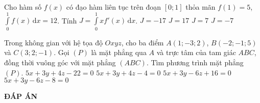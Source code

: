 \begin{ex}[2D3G2-4]
Cho hàm số $f(x)$ có đạo hàm liên tục trên đoạn $[0;1]$ thỏa mãn $f(1) = 5$, $\displaystyle\int\limits_0^1 f(x) \mathrm{\,d}x = 12$. Tính $J = \displaystyle\int\limits_0^1 x f'(x) \mathrm{\,d}x$.
\choice
{$J = -17$}
{$J = 17$}
{$J = 7$}
{\True $J = -7$}
\end{ex}

\begin{ex}%
Trong không gian với hệ tọa độ $Oxyz$, cho ba điểm $A(1;-3;2)$, $B(-2;-1;5)$ và $C(3;2;-1)$. Gọi $(P)$ là mặt phẳng qua $A$ và trực tâm của tam giác $ABC$, đồng thời vuông góc với mặt phẳng $(ABC)$. Tìm phương trình mặt phẳng $(P)$.
\choice
{$5x + 3y + 4z -22 = 0$}
{$5x + 3y + 4z - 4 = 0$}
{\True $5x + 3y - 6z + 16 = 0$}
{$5x + 3y - 6z - 8 = 0$}
\end{ex}

\newpage
\begin{center}
	\textbf{ĐÁP ÁN}
\end{center}
\begin{multicols}{10}
	 
\end{multicols}



